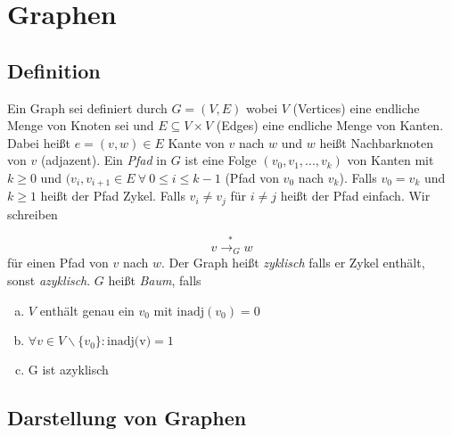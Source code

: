%

\chapter{Graphen}
    \section{Definition}
        Ein Graph sei definiert durch $G=(V,E)$ wobei $V$ (Vertices) eine endliche Menge von Knoten sei und $E \subseteq V \times V$ (Edges) eine endliche Menge von Kanten. Dabei heißt $e=(v,w) \in E$ Kante von $v$ nach $w$ und $w$ heißt Nachbarknoten von $v$ (adjazent). Ein \emph{Pfad} in $G$ ist eine Folge $(v_0,v_1,...,v_k)$ von Kanten mit $k \geq 0$ und $(v_i,v_{i+1} \in E \ \forall \ 0 \leq i \leq k-1$ (Pfad von $v_0$ nach $v_k$). Falls $v_0 = v_k$ und $k \geq 1$ heißt der Pfad Zykel. Falls $v_i \neq v_j$ für $i \neq j$ heißt der Pfad einfach. Wir schreiben
     
        $$
            v \overset{*}{\rightarrow_{G}} w 
        $$
        für einen Pfad von $v$ nach $w$. Der Graph heißt \emph{zyklisch} falls er Zykel enthält, sonst \emph{azyklisch}. $G$ heißt \emph{Baum}, falls
        \begin{enumerate}[a)]
            \item $V$ enthält genau ein $v_0$ mit $\text{inadj}(v_0) = 0$
            \item $\forall v \in V \backslash \{v_0\} : \text{inadj(v)}=1$
            \item G ist azyklisch
        \end{enumerate}
        
        \section{Darstellung von Graphen}            
